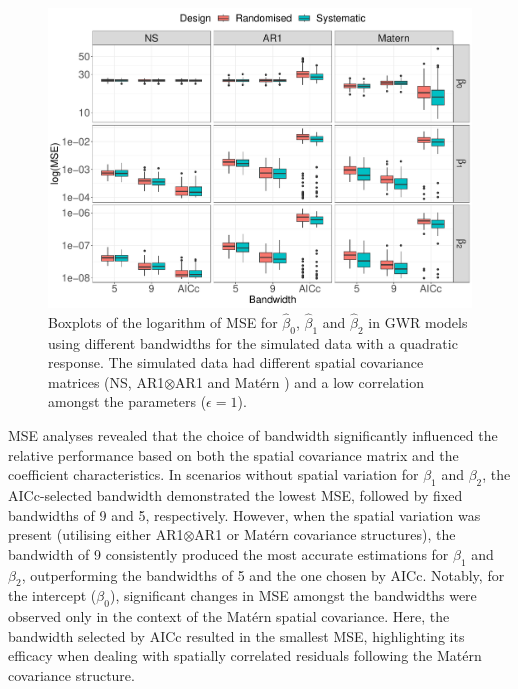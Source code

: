 \documentclass[a4paper]{article} 	%
\newcommand{\Matern}{Mat\'ern }
\begin{document}
\begin{figure}[!thp]
	\centering
	\includegraphics[width=\linewidth]{Col_QuaCombMSE_newpar.pdf}
	\caption{Boxplots of the logarithm of MSE for $\hat{\beta}_0$, $\hat{\beta}_1$ and $\hat{\beta}_2$ in GWR models using different bandwidths for the simulated data with a quadratic response. The simulated data had different spatial covariance matrices (NS, AR1$\otimes$AR1 and \Matern) and a low correlation amongst the parameters ($\epsilon=1$).} \label{fig:QuadBetaMSE}
\end{figure}



MSE analyses revealed that the choice of bandwidth significantly influenced the relative performance based on both the spatial covariance matrix and the coefficient characteristics. In scenarios without spatial variation for $\beta_1$ and $\beta_2$, the AICc-selected bandwidth demonstrated the lowest MSE, followed by fixed bandwidths of 9 and 5, respectively. However, when the spatial variation was present (utilising either AR1$\otimes$AR1 or \Matern covariance structures), the bandwidth of 9 consistently produced the most accurate estimations for $\beta_1$ and $\beta_2$, outperforming the bandwidths of 5 and the one chosen by AICc. Notably, for the intercept ($\beta_0$), significant changes in MSE amongst the bandwidths were observed only in the context of the \Matern spatial covariance. Here, the bandwidth selected by AICc resulted in the smallest MSE, highlighting its efficacy when dealing with spatially correlated residuals following the \Matern covariance structure. 
\end{document}
